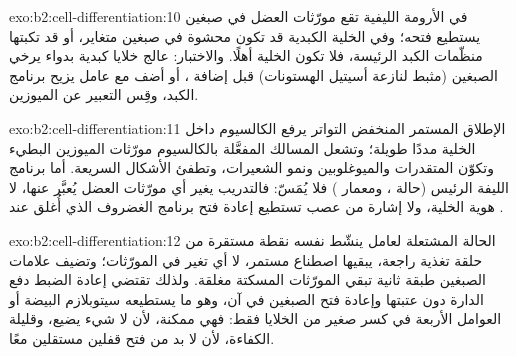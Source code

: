 \begin{solution}{exo:b2:cell-differentiation:10}
في الأرومة الليفية تقع مورّثات العضل في صبغين يستطيع 
فتحه؛ وفي الخلية الكبدية قد تكون محشوة في صبغين متغاير، أو قد
تكبتها منظّمات الكبد الرئيسة، فلا تكون الخلية
أهلًا. والاختبار: عالج خلايا كبدية بدواء يرخي
الصبغين (مثبط لنازعة أسيتيل الهستونات) قبل إضافة ، أو
أضف  مع عامل يزيح برنامج
الكبد، وقِس التعبير عن الميوزين.
\end{solution}

\begin{solution}{exo:b2:cell-differentiation:11}
الإطلاق المستمر المنخفض التواتر يرفع الكالسيوم داخل الخلية
مددًا طويلة؛ وتشعل المسالك المفعَّلة بالكالسيوم مورّثات
الميوزين البطيء وتكوّن المتقدرات والميوغلوبين ونمو
الشعيرات، وتطفئ الأشكال السريعة. أما برنامج الليفة
الرئيس (حالة ، ومعمار ) فلا يُمَسّ:
فالتدريب يغير أي مورّثات العضل يُعبَّر عنها، لا
هوية الخلية، ولا إشارة من عصب تستطيع إعادة فتح
برنامج الغضروف الذي أُغلق عند .
\end{solution}

\begin{solution}{exo:b2:cell-differentiation:12}
الحالة المشتعلة لعامل ينشّط نفسه نقطة مستقرة من
حلقة تغذية راجعة، يبقيها اصطناع مستمر، لا أي تغير في
المورّثات؛ وتضيف علامات الصبغين طبقة ثانية تبقي المورّثات
المسكتة مغلقة. ولذلك تقتضي إعادة الضبط دفع الدارة
دون عتبتها وإعادة فتح الصبغين في آن، وهو ما يستطيعه
سيتوبلازم البيضة أو العوامل الأربعة في كسر صغير من
الخلايا فقط: فهي ممكنة، لأن لا شيء يضيع، وقليلة الكفاءة، لأن
لا بد من فتح قفلين مستقلين معًا.
\end{solution}

